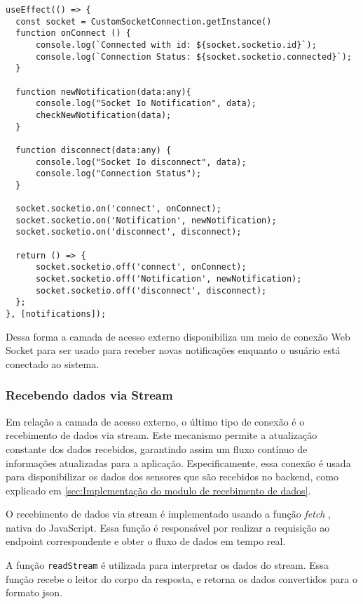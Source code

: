 \begin{verbatim}
useEffect(() => {
  const socket = CustomSocketConnection.getInstance()
  function onConnect () {
      console.log(`Connected with id: ${socket.socketio.id}`);
      console.log(`Connection Status: ${socket.socketio.connected}`);
  }

  function newNotification(data:any){
      console.log("Socket Io Notification", data);
      checkNewNotification(data);
  }

  function disconnect(data:any) {
      console.log("Socket Io disconnect", data);
      console.log("Connection Status");
  }

  socket.socketio.on('connect', onConnect);
  socket.socketio.on('Notification', newNotification);
  socket.socketio.on('disconnect', disconnect);

  return () => {
      socket.socketio.off('connect', onConnect);
      socket.socketio.off('Notification', newNotification);
      socket.socketio.off('disconnect', disconnect);
  };
}, [notifications]);
\end{verbatim}

Dessa forma a camada de acesso externo disponibiliza um meio de conexão Web Socket para ser usado para receber novas notificações enquanto o usuário está conectado ao sistema.

\subsubsection{Recebendo dados via Stream}\label{subsec:streamData}

Em relação a camada de acesso externo, o último tipo de conexão é o recebimento de dados via stream. Este mecanismo permite a atualização constante dos dados recebidos, garantindo assim um fluxo contínuo de informações atualizadas para a aplicação. Especificamente, essa conexão é usada para disponibilizar os dados dos sensores que são recebidos no backend, como explicado em \ref{sec:Implementação do modulo de recebimento de dados}.

O recebimento de dados via stream é implementado usando a função \textit{fetch} \cite{mdnFetchAPI}, nativa do JavaScript. Essa função é responsável por realizar a requisição ao endpoint correspondente e obter o fluxo de dados em tempo real.

A função \texttt{readStream} é utilizada para interpretar os dados do stream. Essa função recebe o leitor do corpo da resposta, e retorna os dados convertidos para o formato \gls{json}.

